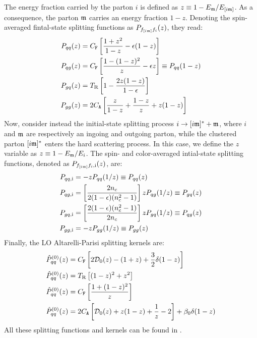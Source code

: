 The energy fraction carried by the parton $ i $ is defined as $ z \equiv 1 - E_{\mathfrak{m}} / E_{[i\mathfrak{m}]} $. As a consequence, the parton $ \mathfrak{m} $ carries an energy fraction $ 1 - z $. Denoting the spin-averaged fintal-state splitting functions as $ P_{f_{[i\mathfrak{m}]}f_i}(z) $, they read:
\begin{align}
  P_{qq}(z) & = C_\mathtt{F} \left[ \frac{1 + z^2}{1 - z} - \epsilon (1 - z) \right] \\
  P_{qg}(z) & = C_\mathtt{F} \left[ \frac{1 - (1 - z)^2}{z} - \epsilon z \right] \equiv P_{qq}(1 - z) \\
  P_{gq}(z) & = T_\text{R} \left[ 1 - \frac{2z (1 - z)}{1 - \epsilon} \right] \\
  P_{gg}(z) & = 2 C_\mathtt{A} \left[ \frac{z}{1 - z} + \frac{1 - z}{z} + z (1 - z) \right]
\end{align}
Now, consider instead the initial-state splitting process $ i \rightarrow [i\mathfrak{m}]^* + \mathfrak{m} $, where $ i $ and $ \mathfrak{m} $ are respectively an ingoing and outgoing parton, while the clustered parton $ [i\mathfrak{m}]^* $ enters the hard scattering process. In this case, we define the $ z $ variable as $ z \equiv 1 - E_{\mathfrak{m}} / E_i $. The spin- and color-averaged intial-state splitting functions, denoted as $ P_{f_{[i\mathfrak{m}]}f_i, \text{i}}(z) $, are:
\begin{align}
  P_{qq,\text{i}} & = - z P_{qq}(1/z) \equiv P_{qq}(z) \\
  P_{qg,\text{i}} & = \left[ \frac{2n_c}{2 (1 - \epsilon) (n_c^2 - 1)} \right] z P_{qg}(1/z) \equiv P_{gq}(z) \\
  P_{gq,\text{i}} & = \left[ \frac{2 (1 - \epsilon) (n_c^2 - 1)}{2n_c} \right] z P_{gq}(1/z) \equiv P_{qg}(z) \\
  P_{gg,\text{i}} & = - z P_{gg}(1/z) \equiv P_{gg}(z)
\end{align}
Finally, the LO Altarelli-Parisi splitting kernels are:
\begin{align}
  \hat{P}^{(0)}_{qq}(z) & = C_\mathtt{F} \left[ 2 \mathcal{D}_0(z) - (1 + z) + \frac{3}{2} \delta(1 - z) \right] \\
  \hat{P}^{(0)}_{qq}(z) & = T_\text{R} \left[ (1 - z)^2 + z^2 \right] \\
  \hat{P}^{(0)}_{qq}(z) & = C_\mathtt{F} \left[ \frac{1 + (1 - z)^2}{z} \right] \\
  \hat{P}^{(0)}_{qq}(z) & = 2 C_\mathtt{A} \left[ \mathcal{D}_0(z) + z (1 - z) + \frac{1}{z} - 2 \right] + \beta_0 \delta(1 - z)
\end{align}
All these splitting functions and kernels can be found in \cite{Ellis-1996}.










